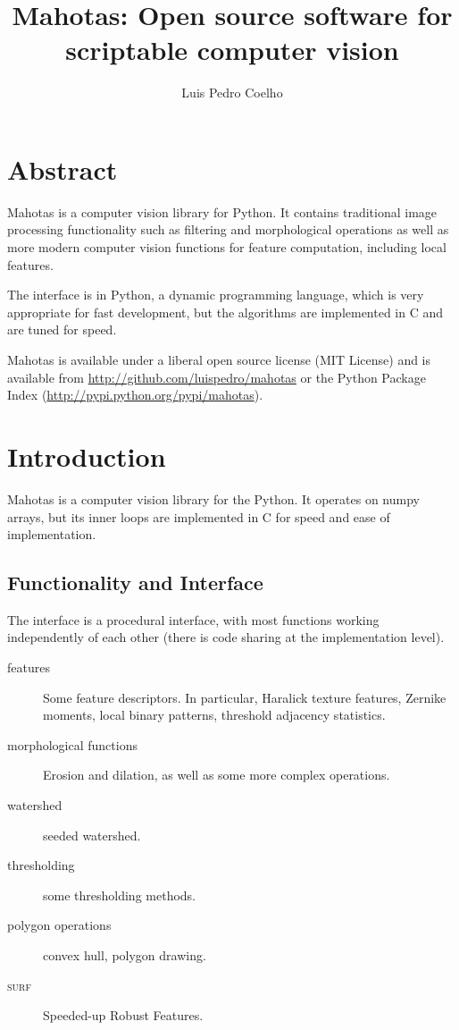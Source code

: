 \documentclass{article}
\title{Mahotas: Open source software for scriptable computer vision}
\author{Luis Pedro Coelho}
\newcommand*{\cpp}{{C\nolinebreak[4]\hspace{-.05em}\raisebox{.4ex}{\tiny\textbf{++}}}}
\begin{document}
\maketitle

\section*{Abstract}
Mahotas is a computer vision library for Python. It contains traditional image
processing functionality such as filtering and morphological operations as well
as more modern computer vision functions for feature computation, including
local features.

The interface is in Python, a dynamic programming language, which is very
appropriate for fast development, but the algorithms are implemented in \cpp{}
and are tuned for speed.

Mahotas is available under a liberal open source license (MIT License) and is
available from \url{http://github.com/luispedro/mahotas} or the Python Package
Index (\url{http://pypi.python.org/pypi/mahotas}).

\section{Introduction}

Mahotas is a computer vision library for the Python. It operates on numpy arrays,
but its inner loops are implemented in \cpp{} for speed and ease of
implementation.

\subsection{Functionality and Interface}

The interface is a procedural interface, with most functions working
independently of each other (there is code sharing at the implementation
level).

\begin{description}
\item[features] Some feature descriptors. In particular, Haralick texture
features, Zernike moments, local binary patterns, threshold adjacency
statistics.
\item[morphological functions] Erosion and dilation, as well as some more
complex operations.
\item[watershed] seeded watershed.
\item[thresholding] some thresholding methods.
\item[polygon operations] convex hull, polygon drawing.
\item[\textsc{surf}] Speeded-up Robust Features.
\end{description}
\end{document}

